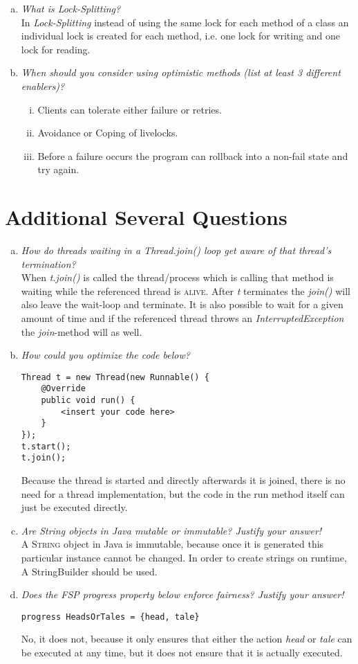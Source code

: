 \documentclass{report}
\begin{document}
\begin{enumerate}[a)]
			\item \textit{What is Lock-Splitting?} \\
			In \textit{Lock-Splitting} instead of using the same lock for each method of a class an individual lock is created for each method, i.e. one lock for writing and one lock for reading.
			\item \textit{When should you consider using optimistic methods (list at least 3 different enablers)?}
			\begin{enumerate}[(i)]
				\item Clients can tolerate either failure or retries.
				\item Avoidance or Coping of livelocks.
				\item Before a failure occurs the program can rollback into a non-fail state and try again.
			\end{enumerate}
		\end{enumerate}
	\closesection
	
	\newpage
	\setcounter{section}{2}	
	\section{Additional Several Questions}
	\startsection
		\begin{enumerate}[a)]
			\item \textit{How do threads waiting in a Thread.join() loop get aware of that thread’s termination?} \\
			When \textit{t.join()} is called the thread/process which is calling that method is waiting while the referenced thread is \textsc{alive}. After \textit{t} terminates the \textit{join()} will also leave the wait-loop and terminate. It is also possible to wait for a given amount of time and if the referenced thread throws an \textit{InterruptedException} the \textit{join}-method will as well.
			\item \textit{How could you optimize the code below?}
			\begin{verbatim}
Thread t = new Thread(new Runnable() {
	@Override
	public void run() {
		<insert your code here>
	}
});
t.start();
t.join();
			\end{verbatim}
			Because the thread is started and directly afterwards it is joined, there is no need for a thread implementation, but the code in the run method itself can just be executed directly.
			\item \textit{Are String objects in Java mutable or immutable? Justify your answer!} \\
			A \textsc{String} object in Java is immutable, because once it is generated this particular instance cannot be changed. In order to create strings on runtime, A StringBuilder should be used.
			\item \textit{Does the FSP progress property below enforce fairness? Justify your answer!}
			\begin{verbatim}
progress HeadsOrTales = {head, tale}
			\end{verbatim}
			No, it does not, because it only ensures that either the action \textit{head} or \textit{tale} can be executed at any time, but it does not ensure that it is actually executed.
		\end{enumerate}
	\closesection
\end{document}
